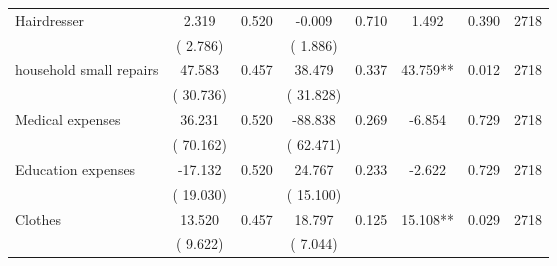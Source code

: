 \begin{tabular}{l*{7}{c}}
 Hairdresser       &              2.319       &        0.520  &             -0.009       &        0.710  &              1.492       &              0.390 &  2718 \\ 
                       &       (       2.786)             &                               &       (       1.886)                     &                               &                                               &                                &                      \\ 

 household small repairs       &             47.583       &        0.457  &             38.479       &        0.337  &             43.759**       &              0.012 &  2718 \\ 
                       &       (      30.736)             &                               &       (      31.828)                     &                               &                                               &                                &                      \\ 

 Medical expenses       &             36.231       &        0.520  &            -88.838       &        0.269  &             -6.854       &              0.729 &  2718 \\ 
                       &       (      70.162)             &                               &       (      62.471)                     &                               &                                               &                                &                      \\ 

 Education expenses       &            -17.132       &        0.520  &             24.767       &        0.233  &             -2.622       &              0.729 &  2718 \\ 
                       &       (      19.030)             &                               &       (      15.100)                     &                               &                                               &                                &                      \\ 

 Clothes       &             13.520       &        0.457  &             18.797       &        0.125  &             15.108**       &              0.029 &  2718 \\ 
                       &       (       9.622)             &                               &       (       7.044)                     &                               &                                               &                                &                      \\ 


\end{tabular}
